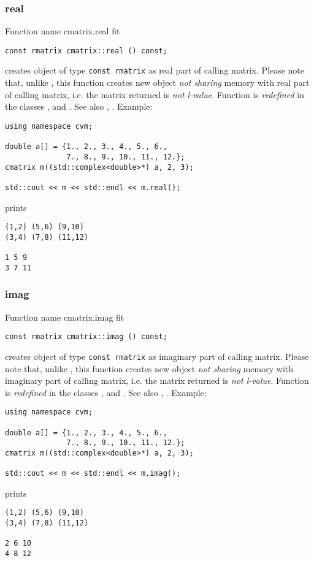 \subsubsection{real}
Function%
\pdfdest name {cmatrix.real} fit
\begin{verbatim}
const rmatrix cmatrix::real () const;
\end{verbatim}
creates  object of type \verb"const rmatrix"
as  real part
of  calling matrix.
Please note that, unlike
, this
function creates new object \emph{not sharing}  memory
with real part of calling matrix, i.e.
the matrix returned is \emph{not  l-value}.
Function is \emph{redefined} in the classes
,  and
.
See also
,
.
Example:
\begin{Verbatim}
using namespace cvm;

double a[] = {1., 2., 3., 4., 5., 6.,
              7., 8., 9., 10., 11., 12.};
cmatrix m((std::complex<double>*) a, 2, 3);

std::cout << m << std::endl << m.real();
\end{Verbatim}
prints
\begin{Verbatim}
(1,2) (5,6) (9,10)
(3,4) (7,8) (11,12)

1 5 9
3 7 11
\end{Verbatim}
\newpage




\subsubsection{imag}
Function%
\pdfdest name {cmatrix.imag} fit
\begin{verbatim}
const rmatrix cmatrix::imag () const;
\end{verbatim}
creates  object of type \verb"const rmatrix"
as  imaginary part
of  calling matrix.
Please note that, unlike
, this
function creates new object \emph{not sharing}  memory
with  imaginary part of  calling matrix, i.e.
the matrix returned is \emph{not  l-value}.
Function is \emph{redefined} in the classes
,  and
.
See also
,
.
Example:
\begin{Verbatim}
using namespace cvm;

double a[] = {1., 2., 3., 4., 5., 6.,
              7., 8., 9., 10., 11., 12.};
cmatrix m((std::complex<double>*) a, 2, 3);

std::cout << m << std::endl << m.imag();
\end{Verbatim}
prints
\begin{Verbatim}
(1,2) (5,6) (9,10)
(3,4) (7,8) (11,12)

2 6 10
4 8 12
\end{Verbatim}
\newpage





